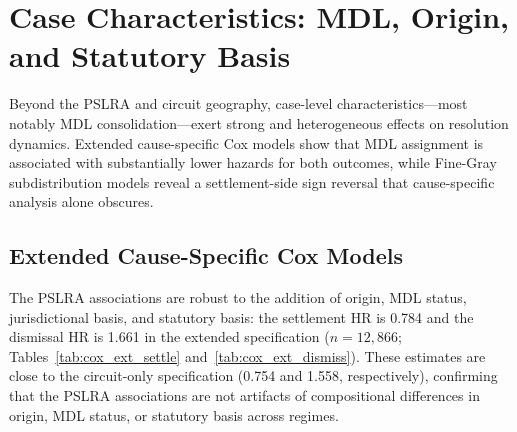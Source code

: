 \section{Case Characteristics: MDL, Origin, and Statutory Basis}
\label{sec:results_characteristics}

Beyond the PSLRA and circuit geography, case-level characteristics---most
notably MDL consolidation---exert strong and heterogeneous effects on
resolution dynamics. Extended cause-specific Cox models show that MDL
assignment is associated with substantially lower hazards for both outcomes,
while Fine-Gray subdistribution models reveal a settlement-side sign
reversal that cause-specific analysis alone obscures.

\subsection{Extended Cause-Specific Cox Models}

The PSLRA associations are robust to the addition of origin, MDL status,
jurisdictional basis, and statutory basis: the settlement HR is 0.784 and the dismissal HR is 1.661 in the extended specification ($n = 12{,}866$;
Tables~\ref{tab:cox_ext_settle} and~\ref{tab:cox_ext_dismiss}). These
estimates are close to the circuit-only specification (0.754 and 1.558,
respectively), confirming that the PSLRA associations are not artifacts of
compositional differences in origin, MDL status, or statutory basis across
regimes.



